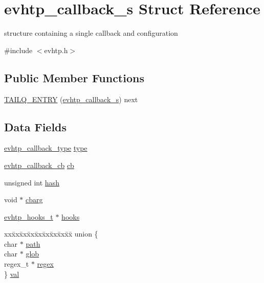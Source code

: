 \hypertarget{structevhtp__callback__s}{\section{evhtp\-\_\-callback\-\_\-s Struct Reference}
\label{structevhtp__callback__s}
}


structure containing a single callback and configuration  




{\ttfamily \#include $<$evhtp.\-h$>$}

\subsection*{Public Member Functions}
\begin{DoxyCompactItemize}
\item 
\hyperlink{structevhtp__callback__s_a868386a43f28c816f0e8e12f7c9aec7d}{T\-A\-I\-L\-Q\-\_\-\-E\-N\-T\-R\-Y} (\hyperlink{structevhtp__callback__s}{evhtp\-\_\-callback\-\_\-s}) next
\end{DoxyCompactItemize}
\subsection*{Data Fields}
\begin{DoxyCompactItemize}
\item 
\hyperlink{evhtp_8h_a6f45c416976c807084c7f71cb15c4f37}{evhtp\-\_\-callback\-\_\-type} \hyperlink{structevhtp__callback__s_a6da94264a51bd354aca3d22098a2aee5}{type}
\item 
\hyperlink{evhtp_8h_a7339527d6a07b47cd28bf29572c9e082}{evhtp\-\_\-callback\-\_\-cb} \hyperlink{structevhtp__callback__s_a783ee29046d4ff3e8c75f811e80fd57b}{cb}
\item 
unsigned int \hyperlink{structevhtp__callback__s_a09f9a9ce240560b1d191b42ed56af642}{hash}
\item 
void $\ast$ \hyperlink{structevhtp__callback__s_aafd3d1a6343925cb274875556a6faa0e}{cbarg}
\item 
\hyperlink{evhtp_8h_ac77d779459ec62f309d1fb09c5540786}{evhtp\-\_\-hooks\-\_\-t} $\ast$ \hyperlink{structevhtp__callback__s_ac97663394f74c9030e57c771cfb7981e}{hooks}
\item 
\begin{tabbing}
xx\=xx\=xx\=xx\=xx\=xx\=xx\=xx\=xx\=\kill
union \{\\
\>char $\ast$ \hyperlink{structevhtp__callback__s_a44196e6a5696d10442c29e639437196e}{path}\\
\>char $\ast$ \hyperlink{structevhtp__callback__s_ac921642f435071137acef3e073973b99}{glob}\\
\>regex\_t $\ast$ \hyperlink{structevhtp__callback__s_af71a3fad7fee5d731252ce89e56f948f}{regex}\\
\} \hyperlink{structevhtp__callback__s_a46fe687f5d6aa04ca3260318f08188b4}{val}\\

\end{tabbing}\end{DoxyCompactItemize}


